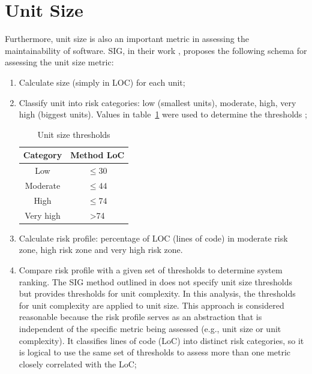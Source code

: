 \documentclass[11pt]{report}
\begin{document}
\section{Unit Size}
\label{sec:unit-size}

Furthermore, unit size is also an important metric in assessing the maintainability of software. SIG, in their work \cite{Heitlager2007}, proposes the following schema for assessing the unit size metric:
\begin{enumerate}
\item Calculate size (simply in LOC) for each unit;
\item Classify unit into risk categories: low (smallest units), moderate, high, very high (biggest units). Values in table~\ref{tab:unit-size-thresholds} were used to determine the thresholds \cite{Tiago2010};

\begin{table}[H]
    \centering
    \begin{tabular}{|c|c|}
        \hline
        \textbf{Category} & \textbf{Method LoC} \\ \hline
        Low & $\leq 30$ \\ \hline
        Moderate & $\leq 44$ \\ \hline
        High & $\leq 74$ \\ \hline
        Very high & \textgreater 74 \\ \hline
    \end{tabular}
    \caption{Unit size thresholds}
    \label{tab:unit-size-thresholds}
\end{table}

\item Calculate risk profile: percentage of LOC (lines of code) in  moderate risk zone, high risk zone and very high risk zone.

\item Compare risk profile with a given set of thresholds to determine system ranking. The SIG method outlined in \cite{Heitlager2007} does not specify unit size thresholds but provides thresholds for unit complexity. In this analysis, the thresholds for unit complexity are applied to unit size. This approach is considered reasonable because the risk profile serves as an abstraction that is independent of the specific metric being assessed (e.g., unit size or unit complexity). It classifies lines of code (LoC) into distinct risk categories, so it is logical to use the same set of thresholds to assess more than one metric closely correlated with the LoC;
\end{enumerate}
\end{document}
